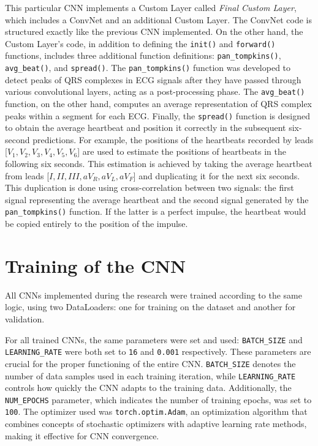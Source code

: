 \documentclass[12pt,italian]{report}
\begin{document}
This particular CNN implements a Custom Layer called \textit{Final Custom Layer}, which includes a ConvNet and an additional Custom Layer. The ConvNet code is structured exactly like the previous CNN implemented. On the other hand, the Custom Layer's code, in addition to defining the \texttt{init()} and \texttt{forward()} functions, includes three additional function definitions: \texttt{pan\_tompkins()}, \texttt{avg\_beat()}, and \texttt{spread()}. The \texttt{pan\_tompkins()} function was developed to detect peaks of QRS complexes in ECG signals after they have passed through various convolutional layers, acting as a post-processing phase. The \texttt{avg\_beat()} function, on the other hand, computes an average representation of QRS complex peaks within a segment for each ECG. Finally, the \texttt{spread()} function is designed to obtain the average heartbeat and position it correctly in the subsequent six-second predictions. For example, the positions of the heartbeats recorded by leads [$ V_{1}, V_{2}, V_{3}, V_{4}, V_{5}, V_{6} $] are used to estimate the positions of heartbeats in the following six seconds. This estimation is achieved by taking the average heartbeat from leads [$ I, II, III, aV_{R}, aV_{L}, aV_{F} $] and duplicating it for the next six seconds. This duplication is done using cross-correlation between two signals: the first signal representing the average heartbeat and the second signal generated by the \texttt{pan\_tompkins()} function. If the latter is a perfect impulse, the heartbeat would be copied entirely to the position of the impulse.

\section{Training of the CNN}
\label{sec:addestramento}

All CNNs implemented during the research were trained according to the same logic, using two DataLoaders: one for training on the dataset and another for validation.

For all trained CNNs, the same parameters were set and used: \texttt{BATCH\_SIZE} and \texttt{LEARNING\_RATE} were both set to \texttt{16} and \texttt{0.001} respectively. These parameters are crucial for the proper functioning of the entire CNN. \texttt{BATCH\_SIZE} denotes the number of data samples used in each training iteration, while \texttt{LEARNING\_RATE} controls how quickly the CNN adapts to the training data. Additionally, the \texttt{NUM\_EPOCHS} parameter, which indicates the number of training epochs, was set to \texttt{100}. The optimizer used was \texttt{torch.optim.Adam}, an optimization algorithm that combines concepts of stochastic optimizers with adaptive learning rate methods, making it effective for CNN convergence.
\end{document}
